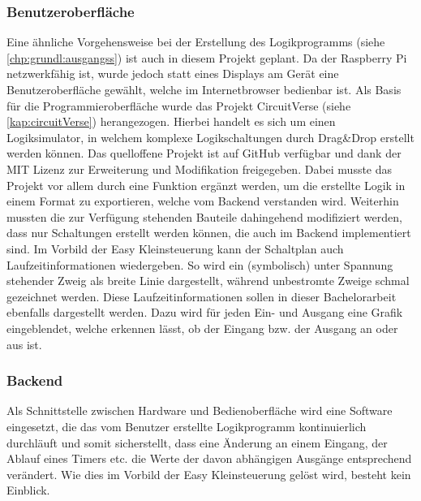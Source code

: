 \subsubsection{Benutzeroberfläche} \label{kap:grundl:bedienoberfl}
Eine ähnliche Vorgehensweise bei der Erstellung des Logikprogramms (siehe \autoref{chp:grundl:ausgangss}) ist auch in diesem Projekt geplant. Da der Raspberry Pi netzwerkfähig ist, wurde jedoch statt eines Displays am Gerät eine Benutzeroberfläche gewählt, welche im Internetbrowser bedienbar ist. Als Basis für die Programmieroberfläche wurde das Projekt CircuitVerse\cite{URL:CircuitVerse} (siehe \autoref{kap:circuitVerse}) herangezogen. Hierbei handelt es sich um einen Logiksimulator, in welchem komplexe Logikschaltungen durch Drag\&Drop erstellt werden können. Das quelloffene Projekt ist auf GitHub\cite{URL:CircuitVerseGit} verfügbar und dank der MIT Lizenz zur Erweiterung und Modifikation freigegeben. Dabei musste das Projekt vor allem durch eine Funktion ergänzt werden, um die erstellte Logik in einem Format zu exportieren, welche vom Backend verstanden wird. Weiterhin mussten die zur Verfügung stehenden Bauteile dahingehend modifiziert werden, dass nur Schaltungen erstellt werden können, die auch im Backend implementiert sind. 
Im Vorbild der Easy Kleinsteuerung kann der Schaltplan auch Laufzeitinformationen wiedergeben. So wird ein (symbolisch) unter Spannung stehender Zweig als breite Linie dargestellt, während unbestromte Zweige schmal gezeichnet werden. Diese Laufzeitinformationen sollen in dieser Bachelorarbeit ebenfalls dargestellt werden. Dazu wird für jeden Ein- und Ausgang eine Grafik eingeblendet, welche erkennen lässt, ob der Eingang bzw. der Ausgang an oder aus ist.
\subsubsection{Backend} \label{chp:grundl:backend}
Als Schnittstelle zwischen Hardware und Bedienoberfläche wird eine Software eingesetzt, die das vom Benutzer erstellte Logikprogramm kontinuierlich durchläuft und somit sicherstellt, dass eine Änderung an einem Eingang, der Ablauf eines Timers etc. die Werte der davon abhängigen Ausgänge entsprechend verändert. Wie dies im Vorbild der Easy Kleinsteuerung gelöst wird, besteht kein Einblick.  

